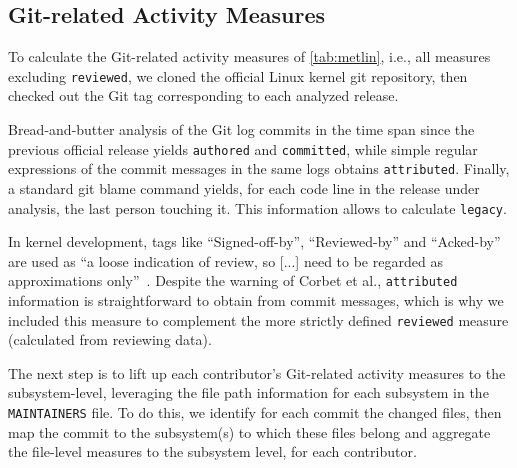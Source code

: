 \subsection{Git-related Activity Measures}
\label{sec:git-relat-activ}

To calculate the Git-related activity measures of \autoref{tab:metlin}, i.e., all measures excluding \texttt{reviewed}, we cloned the official Linux kernel git repository, then checked out the Git tag corresponding to each analyzed release.

Bread-and-butter analysis of the Git log commits in the time span since the previous official release yields \texttt{authored} and \texttt{committed}, while simple regular expressions of the commit messages in the same logs obtains \texttt{attributed}. Finally, a standard git blame command yields, for each code line in the release under analysis, the last person touching it. This information allows to calculate \texttt{legacy}.

In kernel development, tags like ``Signed-off-by'', ``Reviewed-by'' and ``Acked-by'' are used as ``a loose indication of review, so [...] need to be regarded as approximations only''~\cite{corbet17}. Despite the warning of Corbet et al., \texttt{attributed} information is straightforward to obtain from commit messages, which is why we included this measure to complement the more strictly defined \texttt{reviewed} measure (calculated from reviewing data).

The next step is to lift up each contributor's Git-related activity measures to the subsystem-level, leveraging the file path information for each subsystem in the \texttt{MAINTAINERS} file. To do this, we identify for each commit the changed files, then map the commit to the subsystem(s) to which these files belong and aggregate the file-level measures to the subsystem level, for each contributor.%




